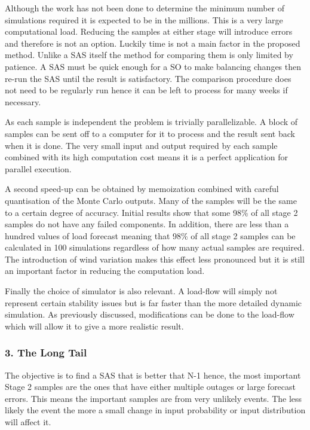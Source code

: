 \documentclass[a4paper,oneside,12pt]{report}
\begin{document}
Although the work has not been done to determine the minimum number of simulations required it is expected to be in the millions. This is a very large computational load. Reducing the samples at either stage will introduce errors and therefore is not an option. Luckily time is not a main factor in the proposed method. Unlike a SAS itself the method for comparing them is only limited by patience. A SAS must be quick enough for a SO to make balancing changes then re-run the SAS until the result is satisfactory. The comparison procedure does not need to be regularly run hence it can be left to process for many weeks if necessary.

As each sample is independent the problem is trivially parallelizable. A block of samples can be sent off to a computer for it to process and the result sent back when it is done. The very small input and output required by each sample combined with its high computation cost means it is a perfect application for parallel execution.

A second speed-up can be obtained by memoization combined with careful quantisation of the Monte Carlo outputs. Many of the samples will be the same to a certain degree of accuracy. Initial results show that some 98\% of all stage 2 samples do not have any failed components. In addition, there are less than a hundred values of load forecast meaning that 98\% of all stage 2 samples can be calculated in 100 simulations regardless of how many actual samples are required. The introduction of wind variation makes this effect less pronounced but it is still an important factor in reducing the computation load.

Finally the choice of simulator is also relevant. A load-flow will simply not represent certain stability issues but is far faster than the more detailed dynamic simulation. As previously discussed, modifications can be done to the load-flow which will allow it to give a more realistic result.

\subsubsection{3. The Long Tail}

The objective is to find a SAS that is better that N-1 hence, the most important Stage 2 samples are the ones that have either multiple outages or large forecast errors. This means the important samples are from very unlikely events. The less likely the event the more a small change in input probability or input distribution will affect it.
\end{document}

